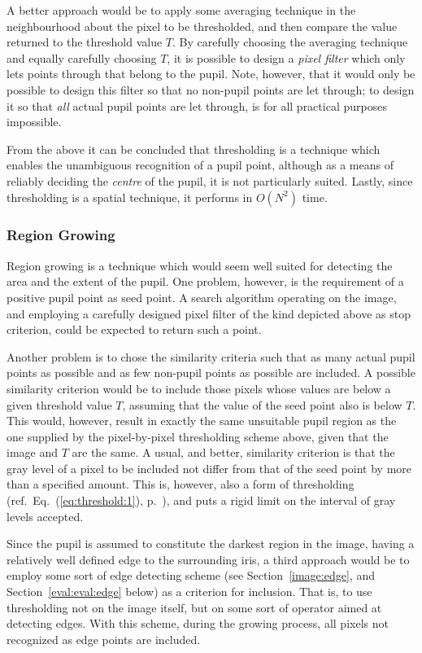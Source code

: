 A better approach would be to apply some averaging technique in the
neighbourhood about the pixel to be thresholded, and then compare the
value returned to the threshold value $T$.  By carefully choosing the
averaging technique and equally carefully choosing $T$, it is possible
to design a {\em pixel filter\/} which only lets points through that
belong to the pupil.  Note, however, that it would only be possible to
design this filter so that no non-pupil points are let through; to
design it so that {\em all\/} actual pupil points are let through, is
for all practical purposes impossible.

From the above it can be concluded that thresholding is a technique
which enables the unambiguous recognition of a pupil point, although
as a means of reliably deciding the {\em centre\/} of the pupil, it is
not particularly suited.  Lastly, since thresholding is a spatial
technique, it performs in $O(N^{2})$ time.

\subsubsection{Region Growing}

Region growing is a technique which would seem well suited for
detecting the area and the extent of the pupil.  One problem, however,
is the requirement of a positive pupil point as seed point.  A search
algorithm operating on the image, and employing a carefully designed
pixel filter of the kind depicted above as stop criterion, could be
expected to return such a point.

Another problem is to chose the similarity criteria such that as many
actual pupil points as possible and as few non-pupil points as
possible are included.  A possible similarity criterion would be to
include those pixels whose values are below a given threshold value
$T$, assuming that the value of the seed point also is below $T$.
This would, however, result in exactly the same unsuitable pupil
region as the one supplied by the pixel-by-pixel thresholding scheme
above, given that the image and $T$ are the same.  A usual, and
better, similarity criterion is that the gray level of a pixel to be
included not differ from that of the seed point by more than a
specified amount.  This is, however, also a form of thresholding
(ref.\ Eq.~(\ref{eq:threshold:1}), p.~\pageref{eq:threshold:1}), and
puts a rigid limit on the interval of gray levels accepted.

Since the pupil is assumed to constitute the darkest region in the
image, having a relatively well defined edge to the surrounding iris,
a third approach would be to employ some sort of edge detecting scheme
(see Section~\ref{image:edge}, and Section~\ref{eval:eval:edge}
below) as a criterion for inclusion.  That is, to use thresholding not
on the image itself, but on some sort of operator aimed at detecting
edges.  With this scheme, during the growing process, all pixels not
recognized as edge points are included.

